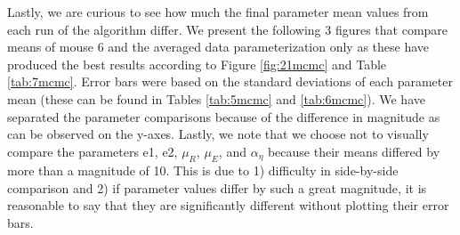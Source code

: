 \par Lastly, we are curious to see how much the final parameter mean values from each run of the algorithm differ. We present the following 3 figures that compare means of mouse 6 and the averaged data parameterization only as these have produced the best results according to Figure \ref{fig:21mcmc} and Table \ref{tab:7mcmc}. Error bars were based on the standard deviations of each parameter mean (these can be found in Tables \ref{tab:5mcmc} and \ref{tab:6mcmc}). We have separated the parameter comparisons because of the difference in magnitude as can be observed on the y-axes. Lastly, we note that we choose not to visually compare the parameters e1, e2, $\mu_R$, $\mu_E$, and $\alpha_\eta$ because their means differed by more than a magnitude of 10. This is due to 1) difficulty in side-by-side comparison and 2) if parameter values differ by such a great magnitude, it is reasonable to say that they are significantly different without plotting their error bars.
